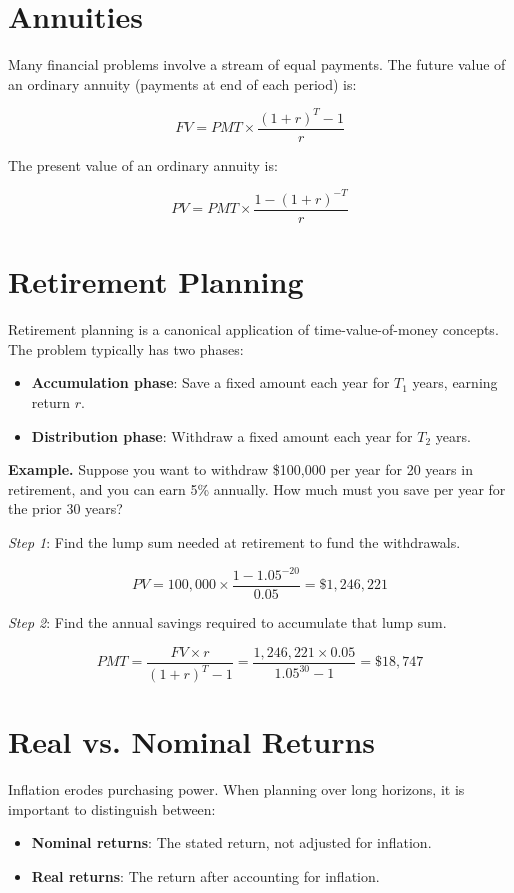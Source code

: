 \documentclass[11pt,letterpaper]{report}
\begin{document}
\section{Annuities}


Many financial problems involve a stream of equal payments.  The future value of an ordinary annuity (payments at end of each period) is:

$$FV = PMT \times \frac{(1+r)^T - 1}{r}$$

The present value of an ordinary annuity is:

$$PV = PMT \times \frac{1 - (1+r)^{-T}}{r}$$

\section{Retirement Planning}


Retirement planning is a canonical application of time-value-of-money concepts.  The problem typically has two phases:

\begin{itemize}
  \item \textbf{Accumulation phase}: Save a fixed amount each year for $T_1$ years, earning return $r$.
  \item \textbf{Distribution phase}: Withdraw a fixed amount each year for $T_2$ years.
\end{itemize}

\textbf{Example.}  Suppose you want to withdraw \$100,000 per year for 20 years in retirement, and you can earn 5\% annually.  How much must you save per year for the prior 30 years?

\textit{Step 1}: Find the lump sum needed at retirement to fund the withdrawals.

$$PV = 100{,}000 \times \frac{1 - 1.05^{-20}}{0.05} = \$1{,}246{,}221$$

\textit{Step 2}: Find the annual savings required to accumulate that lump sum.

$$PMT = \frac{FV \times r}{(1+r)^T - 1} = \frac{1{,}246{,}221 \times 0.05}{1.05^{30} - 1} = \$18{,}747$$

\section{Real vs. Nominal Returns}


Inflation erodes purchasing power.  When planning over long horizons, it is important to distinguish between:

\begin{itemize}
  \item \textbf{Nominal returns}: The stated return, not adjusted for inflation.
  \item \textbf{Real returns}: The return after accounting for inflation.
\end{itemize}
\end{document}
